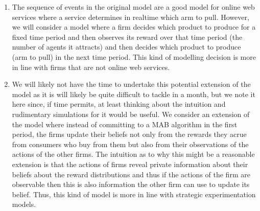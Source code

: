 \documentclass[a4paper]{article}
\begin{document}
\begin{enumerate}
\begin{enumerate}
\item The sequence of events in the original model are a good model for online web services where a service determines in realtime which arm to pull. However, we will consider a model where a firm decides which product to produce for a fixed time period and then observes its reward over that time period (the number of agents it attracts) and then decides which product to produce (arm to pull) in the next time period. This kind of modelling decision is more in line with firms that are not online web services.
\item We will likely not have the time to undertake this potential extension of the model as it is will likely be quite difficult to tackle in a month, but we note it here since, if time permits, at least thinking about the intuition and rudimentary simulations for it would be useful. We consider an extension of the model where instead of committing to a MAB algorithm in the first period, the firms update their beliefs not only from the rewards they acrue from consumers who buy from them but also from their observations of the actions of the other firms. The intuition as to why this might be a reasonable extension is that the actions of firms reveal private information about their beliefs about the reward distributions and thus if the actions of the firm are observable then this is also information the other firm can use to update its belief. Thus, this kind of model is more in line with strategic experimentation models.
\end{enumerate}

\end{enumerate}
\end{document}
